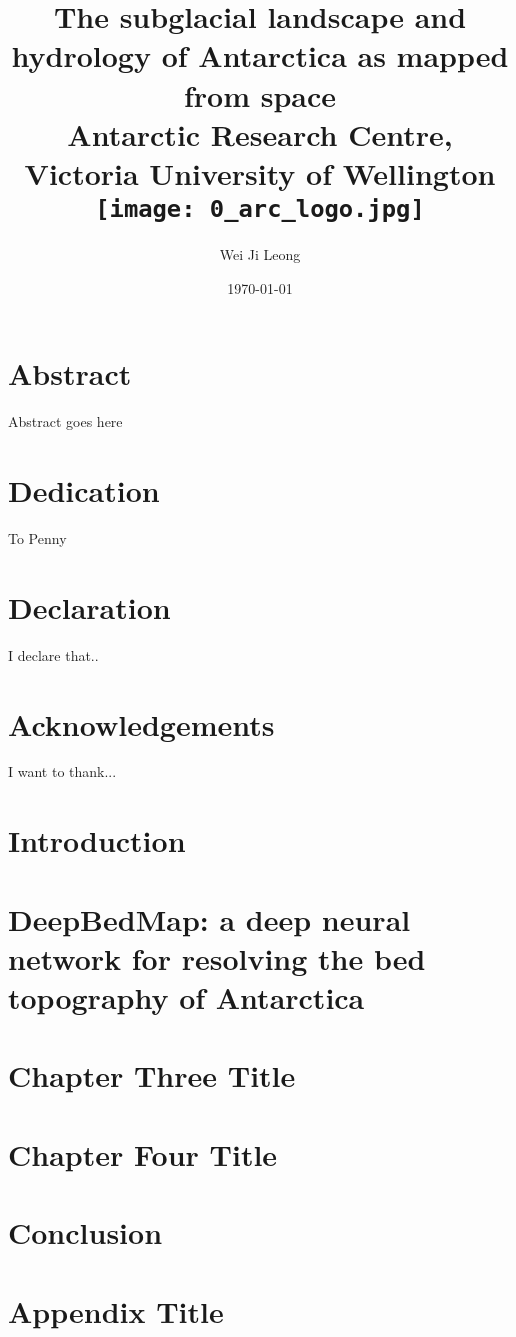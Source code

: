 \documentclass[12pt,twoside]{book}
\title{
{The subglacial landscape and hydrology of Antarctica as mapped from space}\\
{\large Antarctic Research Centre, Victoria University of Wellington}\\
{\texttt{[image: 0\_arc\_logo.jpg]}}
}
\author{Wei Ji Leong}
\date{\today}
\begin{document}


\chapter*{Abstract}
Abstract goes here

\chapter*{Dedication}
To Penny

\chapter*{Declaration}
I declare that..

\chapter*{Acknowledgements}
I want to thank...

\tableofcontents
\listoffigures
\listoftables

\printnoidxglossary[type=symbols,sort=use,style=long,title={List of Symbols}]
\printglossary[type=\acronymtype]

\chapter{Introduction}


\chapter{DeepBedMap: a deep neural network for resolving the bed topography of Antarctica}


\chapter{Chapter Three Title}


\chapter{Chapter Four Title}


\chapter{Conclusion}


\appendix
\chapter{Appendix Title}


\printbibliography
\end{document}
